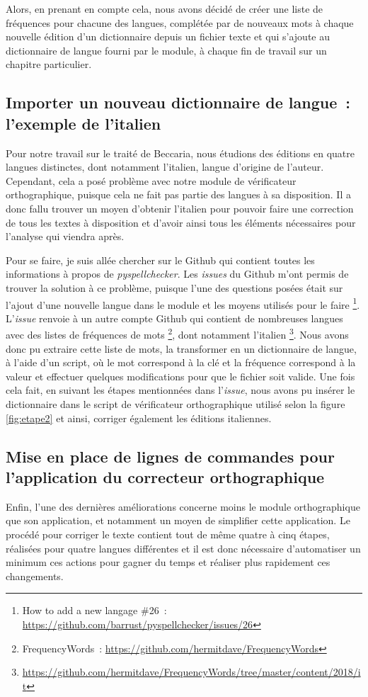 Alors, en prenant en compte cela, nous avons décidé de créer une liste de fréquences pour chacune des langues, complétée par de nouveaux mots à chaque nouvelle édition d'un dictionnaire depuis un fichier texte et qui s'ajoute au dictionnaire de langue fourni par le module, à chaque fin de travail sur un chapitre particulier.

\subsection{Importer un nouveau dictionnaire de langue~: l'exemple de l'italien}
Pour notre travail sur le traité de Beccaria, nous étudions des éditions en quatre langues distinctes, dont notamment l'italien, langue d'origine de l'auteur. Cependant, cela a posé problème avec notre module de vérificateur orthographique, puisque cela ne fait pas partie des langues à sa disposition. Il a donc fallu trouver un moyen d'obtenir l'italien pour pouvoir faire une correction de tous les textes à disposition et d'avoir ainsi tous les éléments nécessaires pour l'analyse qui viendra après.

Pour se faire, je suis allée chercher sur le Github qui contient toutes les informations à propos de \emph{pyspellchecker}. Les \emph{issues} du Github m'ont permis de trouver la solution à ce problème, puisque l'une des questions posées était sur l'ajout d'une nouvelle langue dans le module et les moyens utilisés pour le faire \footnote{How to add a new langage \#26~: \url{https://github.com/barrust/pyspellchecker/issues/26}}. L'\textit{issue} renvoie à un autre compte Github qui contient de nombreuses langues avec des listes de fréquences de mots \footnote{FrequencyWords~: \url{https://github.com/hermitdave/FrequencyWords}}, dont notamment l'italien \footnote{\url{https://github.com/hermitdave/FrequencyWords/tree/master/content/2018/it}}. Nous avons donc pu extraire cette liste de mots, la transformer en un dictionnaire de langue, à l'aide d'un script, où le mot correspond à la clé et la fréquence correspond à la valeur et effectuer quelques modifications pour que le fichier soit valide. Une fois cela fait, en suivant les étapes mentionnées dans l'\textit{issue}, nous avons pu insérer le dictionnaire dans le script de vérificateur orthographique utilisé selon la figure \ref{fig:etape2} et ainsi, corriger également les éditions italiennes.

\subsection{Mise en place de lignes de commandes pour l'application du correcteur orthographique}
Enfin, l'une des dernières améliorations concerne moins le module orthographique que son application, et notamment un moyen de simplifier cette application. Le procédé pour corriger le texte contient tout de même quatre à cinq étapes, réalisées pour quatre langues différentes et il est donc nécessaire d'automatiser un minimum ces actions pour gagner du temps et réaliser plus rapidement ces changements.

